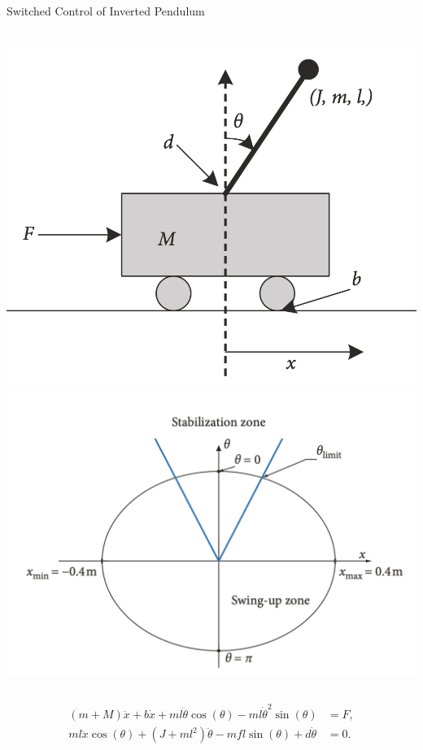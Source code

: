 \documentclass{beamer}
\begin{document}
\begin{frame}{Switched Control of Inverted Pendulum}
\begin{columns}
\includegraphics[width=\textwidth]{ip}  
\includegraphics[width=\textwidth]{stz} 
\end{columns}
\begin{align*}
(m+M)\ddot{x} + b\dot{x} + ml\ddot{\theta}\cos(\theta) -ml\dot{\theta}^2\sin(\theta) &= F, \\
ml\ddot{x}\cos(\theta) + (J+ml^2)\ddot{\theta}-mfl\sin(\theta)+d\dot{\theta} &= 0. 
\end{align*} 
\end{frame}
   
\end{document}

